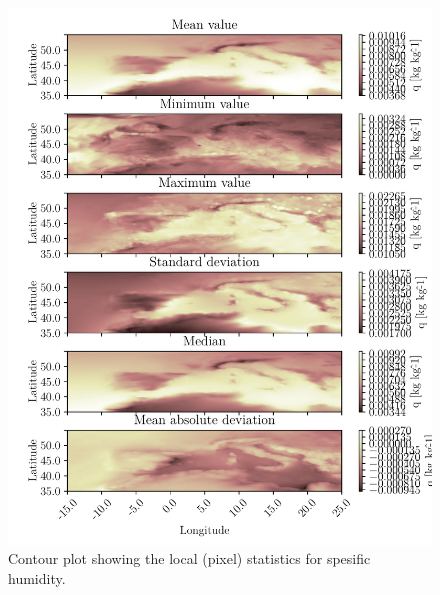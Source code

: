\begin{figure}[ht]
    \centering
    \includegraphics{python_figs/all_stat_variable_q.pdf}
    \caption{Contour plot showing the local (pixel) statistics for spesific humidity.}
    \label{fig:all_stats_q}
\end{figure}


